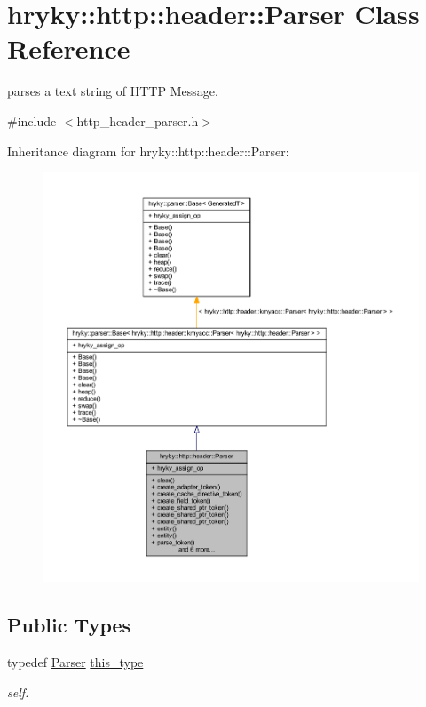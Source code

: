 \hypertarget{classhryky_1_1http_1_1header_1_1_parser}{\section{hryky\-:\-:http\-:\-:header\-:\-:Parser Class Reference}
\label{classhryky_1_1http_1_1header_1_1_parser}
}


parses a text string of H\-T\-T\-P Message.  




{\ttfamily \#include $<$http\-\_\-header\-\_\-parser.\-h$>$}



Inheritance diagram for hryky\-:\-:http\-:\-:header\-:\-:Parser\-:
\nopagebreak
\begin{figure}[H]
\begin{center}
\leavevmode
\includegraphics[width=350pt]{classhryky_1_1http_1_1header_1_1_parser__inherit__graph}
\end{center}
\end{figure}
\subsection*{Public Types}
\begin{DoxyCompactItemize}
\item 
\hypertarget{classhryky_1_1http_1_1header_1_1_parser_aed496466ed39c1bcf709a3be673f3478}{typedef \hyperlink{classhryky_1_1http_1_1header_1_1_parser}{Parser} \hyperlink{classhryky_1_1http_1_1header_1_1_parser_aed496466ed39c1bcf709a3be673f3478}{this\-\_\-type}}\label{classhryky_1_1http_1_1header_1_1_parser_aed496466ed39c1bcf709a3be673f3478}

\begin{DoxyCompactList}\small\item\em self. \end{DoxyCompactList}\end{DoxyCompactItemize}
